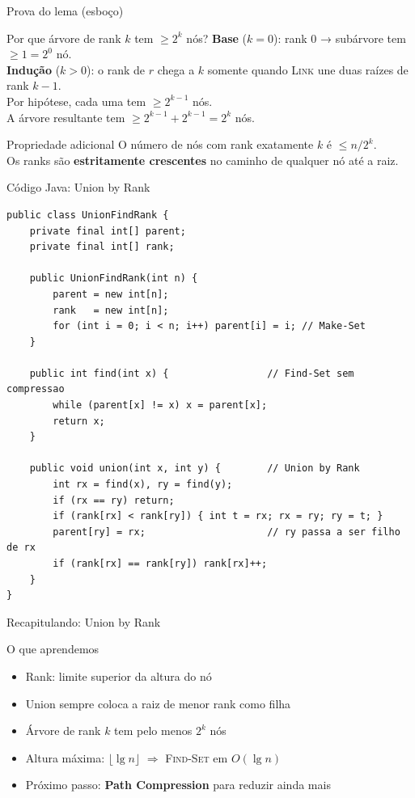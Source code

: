 \documentclass[aspectratio=169]{beamer}
\begin{document}
\begin{frame}{Prova do lema (esboço)}%
  \begin{block}{Por que árvore de rank $k$ tem $\geq 2^k$ nós?}
    \textbf{Base} ($k=0$): rank 0 → subárvore tem $\geq 1 = 2^0$ nó. \checkmark\\[4pt]
    \textbf{Indução} ($k>0$): o rank de $r$ chega a $k$ somente quando \textsc{Link} une duas raízes de rank $k-1$.\\
    Por hipótese, cada uma tem $\geq 2^{k-1}$ nós.\\
    A árvore resultante tem $\geq 2^{k-1} + 2^{k-1} = 2^k$ nós. \checkmark
  \end{block}
  \vspace{0.2cm}
  \begin{alertblock}{Propriedade adicional}
    O número de nós com rank exatamente $k$ é $\leq n/2^k$.\\
    Os ranks são \textbf{estritamente crescentes} no caminho de qualquer nó até a raiz.
  \end{alertblock}
\end{frame}

\begin{frame}[fragile,shrink=25]{Código Java: Union by Rank}%
\begin{lstlisting}
public class UnionFindRank {
    private final int[] parent;
    private final int[] rank;

    public UnionFindRank(int n) {
        parent = new int[n];
        rank   = new int[n];
        for (int i = 0; i < n; i++) parent[i] = i; // Make-Set
    }

    public int find(int x) {                 // Find-Set sem compressao
        while (parent[x] != x) x = parent[x];
        return x;
    }

    public void union(int x, int y) {        // Union by Rank
        int rx = find(x), ry = find(y);
        if (rx == ry) return;
        if (rank[rx] < rank[ry]) { int t = rx; rx = ry; ry = t; }
        parent[ry] = rx;                     // ry passa a ser filho de rx
        if (rank[rx] == rank[ry]) rank[rx]++;
    }
}
\end{lstlisting}
\end{frame}

\begin{frame}{Recapitulando: Union by Rank}%
  \begin{block}{O que aprendemos}
    \begin{itemize}
      \item Rank: limite superior da altura do nó
      \item Union sempre coloca a raiz de menor rank como filha
      \item Árvore de rank $k$ tem pelo menos $2^k$ nós
      \item Altura máxima: $\lfloor\lg n\rfloor$ $\Rightarrow$ \textsc{Find-Set} em $O(\lg n)$
      \item Próximo passo: \textbf{Path Compression} para reduzir ainda mais
    \end{itemize}
  \end{block}
\end{frame}
\end{document}
